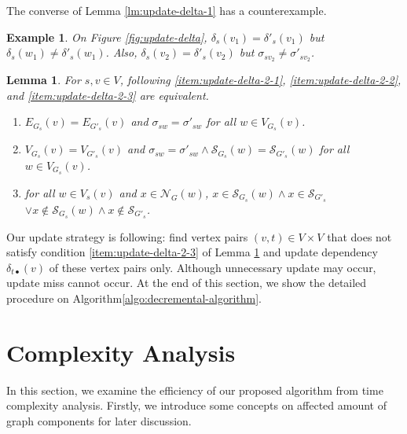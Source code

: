 \documentclass{article}
\newtheorem{example}{Example}
\newtheorem{lemma}{Lemma}
\begin{document}
The converse of Lemma \ref{lm:update-delta-1} has a counterexample.
\begin{example}
  On Figure \ref{fig:update-delta},
  $\delta_s(v_1)=\delta'_s(v_1)$ but $\delta_s(w_1)\neq\delta'_s(w_1)$.
  Also, $\delta_s(v_2)=\delta'_s(v_2)$ but $\sigma_{sv_2}\neq\sigma'_{sv_2}$.
\end{example}

\begin{figure*}
  \centering
  \def\svgwidth{.45\linewidth}
  
  \caption{Counterexample of converse of Lemma \ref{lm:update-delta-1}.}
  \label{fig:update-delta}
\end{figure*}

\begin{lemma}
  \label{lm:update-delta-2}
  For $s,v\in V$, following \ref{item:update-delta-2-1}, \ref{item:update-delta-2-2}, and \ref{item:update-delta-2-3} are equivalent.
  \begin{enumerate}[label={\normalfont (\alph*)}]
  \item $E_{G_s}(v)=E_{G'_s}(v)$ and $\sigma_{sw}=\sigma'_{sw}$ for all $w\in V_{G_s}(v)$.
    \label{item:update-delta-2-1}
  \item $V_{G_s}(v)=V_{G'_s}(v)$ and $\sigma_{sw}=\sigma'_{sw}\land\mathcal{S}_{G_s}(w)=\mathcal{S}_{G'_s}(w)$ for all $w\in V_{G_s}(v)$.
    \label{item:update-delta-2-2}
  \item for all $w\in V_s(v)$ and $x\in\mathcal{N}_G(w)$,
    $x\in\mathcal{S}_{G_s}(w)\land x\in\mathcal{S}_{G'_s}$
    $\lor x\notin\mathcal{S}_{G_s}(w)\land x\notin\mathcal{S}_{G'_s}$.
    \label{item:update-delta-2-3}
  \end{enumerate}
\end{lemma}

Our update strategy is following: find vertex pairs $(v,t)\in V\times V$ that does not satisfy condition \ref{item:update-delta-2-3} of Lemma \ref{lm:update-delta-2} and update dependency $\delta_{t\bullet}(v)$ of these vertex pairs only.
Although unnecessary update may occur, update miss cannot occur.
At the end of this section, we show the detailed procedure on Algorithm\ref{algo:decremental-algorithm}.

\section{Complexity Analysis}
In this section, we examine the efficiency of our proposed algorithm from time complexity analysis.
Firstly, we introduce some concepts on affected amount of graph components for later discussion.
\end{document}
